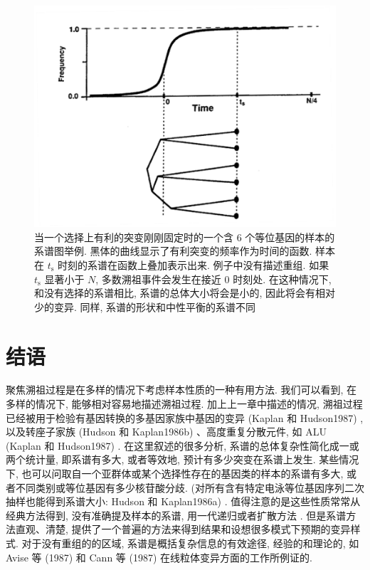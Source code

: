 \documentclass[12pt]{article}
\begin{document}
\begin{figure}
    \centering
    \includegraphics{coalescent-process.images/image10.png}
    \caption{当一个选择上有利的突变刚刚固定时的一个含 6 个等位基因的样本的系谱图举例.
        黑体的曲线显示了有利突变的频率作为时间的函数. 样本在 \(t_{\mathrm{s}}\)
        时刻的系谱在函数上叠加表示出来. 例子中没有描述重组. 如果
        \(t_{\mathrm{s}}\) 显著小于 \(N\), 多数溯祖事件会发生在接近 0 时刻处.
        在这种情况下, 和没有选择的系谱相比, 系谱的总体大小将会是小的,
    因此将会有相对少的变异. 同样, 系谱的形状和中性平衡的系谱不同}
\end{figure}

\section{结语}

聚焦溯祖过程是在多样的情况下考虑样本性质的一种有用方法. 我们可以看到, 在多样的情况下, 能够相对容易地描述溯祖过程.
加上上一章中描述的情况, 溯祖过程已经被用于检验有基因转换的多基因家族中基因的变异 \parencite{Watterson1989a}(Kaplan 和
Hudson1987) , 以及转座子家族 (Hudson 和 Kaplan1986b) 、高度重复分散元件, 如 ALU (Kaplan 和
Hudson1987) . 在这里叙述的很多分析, 系谱的总体复杂性简化成一或两个统计量, 即系谱有多大, 或者等效地,
预计有多少突变在系谱上发生. 某些情况下, 也可以问取自一个亚群体或某个选择性存在的基因类的样本的系谱有多大,
或者不同类别或等位基因有多少核苷酸分歧. (对所有含有特定电泳等位基因序列二次抽样也能得到系谱大小: Hudson 和
Kaplan1986a) . 值得注意的是这些性质常常从经典方法得到, 没有准确提及样本的系谱, 用一代递归或者扩散方法 \parencite{Watterson1989a}.
但是系谱方法直观、清楚, 提供了一个普遍的方法来得到结果和设想很多模式下预期的变异样式. 对于没有重组的的区域,
系谱是概括复杂信息的有效途径, 经验的和理论的, 如 Avise 等 (1987) 和 Cann 等 (1987) 在线粒体变异方面的工作所例证的.
\end{document}
